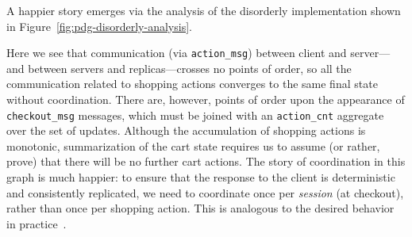 A happier story emerges via the analysis of the disorderly implementation
shown in Figure~\ref{fig:pdg-disorderly-analysis}.

Here we see that communication (via \texttt{action\_msg}) between client and server---and between servers and replicas---crosses no points of order, so all the
communication related to shopping actions converges to the same final state without coordination.
There are, however, points of order upon the appearance of \texttt{checkout\_msg}
messages, which must be joined with an \texttt{action\_cnt} aggregate over the set of updates.  Although the 
accumulation of shopping actions is monotonic, summarization of the cart state
requires us to assume (or rather, prove) that there will be no further cart actions.
The story of coordination in this graph is much happier: to
ensure that the response to the client is deterministic and consistently replicated, we need to coordinate once per {\em session} (at checkout), rather than once per shopping action.  This is analogous to the desired behavior in practice~\cite{quicksand}.
%
